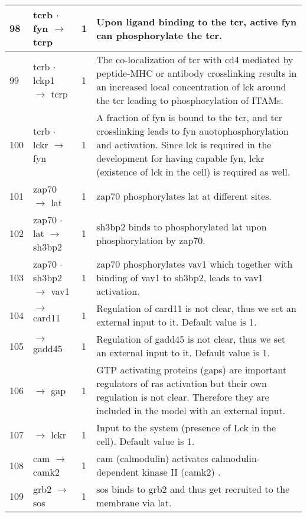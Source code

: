 \documentclass[a4paper, 12pt,epsfig, onecolumn]{article}
\newcommand{\mydot}{\hspace{-0mm} $\cdot$  \hspace{-0mm}}
\begin{document}
{\begin{center}
\begin{longtable}{|p{}|p{}|p{}|p{}|}
98& tcrb\mydot fyn $\rightarrow$ tcrp             &1& Upon ligand binding to the tcr, active fyn can phosphorylate the tcr\cite{FilippD_MolImm_04}. \\ \hline
99& tcrb\mydot lckp1 $\rightarrow$ tcrp               &1&        The  co-localization of tcr with cd4 mediated by peptide-MHC or        antibody crosslinking results in an increased local concentration of lck around the tcr leading to phosphorylation of ITAMs\cite{FilippD_JImm_04}. \\ \hline
100& tcrb\mydot lckr $\rightarrow$ fyn                           &1& A fraction of fyn is bound to the tcr, and tcr crosslinking  leads to fyn auotophosphorylation and activation\cite{FilippD_MolImm_04}. Since lck is required in the development for having capable fyn\cite{ZamoyskaR_ImmunolRev_03}, lckr (existence of lck in the cell) is required as well. \\ \hline
101& zap70 $\rightarrow$ lat                             &1& zap70 phosphorylates lat at different sites\cite{Huang_JBC_04}. \\ \hline
102& zap70\mydot lat $\rightarrow$ sh3bp2                      &1& sh3bp2 binds to phosphorylated lat upon phosphorylation by zap70\cite{Qu_Biochem_05}. \\ \hline
103& zap70\mydot sh3bp2 $\rightarrow$ vav1             &1& zap70 phosphorylates vav1\cite{zakaria:2004} which together with binding of vav1 to sh3bp2\cite{Qu_Biochem_05}, leads to vav1 activation. \\ \hline
104&$\rightarrow$ card11 &1& Regulation of card11 is not clear, thus we set an external input to it. Default value is 1.\\ \hline
105&$\rightarrow$ gadd45 &1& Regulation of  gadd45 is not clear, thus we set an external input to it. Default value is 1.\\ \hline
106&$\rightarrow$ gap &1& GTP activating proteins (gaps) are important regulators of ras activation but their own regulation is not clear\cite{CantrellDA_ImmRev_03}. Therefore they are included in the model with an external input. \\ \hline
107&$\rightarrow$ lckr &1& Input to the system (presence of Lck in the cell). Default value is 1. \\ \hline
108 & cam $\rightarrow$ camk2 &1&  cam (calmodulin) activates calmodulin-dependent kinase II (camk2) \cite{Hughes_JBC_2001}. \\ \hline
109 & grb2 $\rightarrow$ sos &1& sos binds to grb2 and thus get recruited to the membrane via lat\cite{BudayL_JBC_94}. \\ \hline

\end{longtable}
\end{center}}
\end{document}
